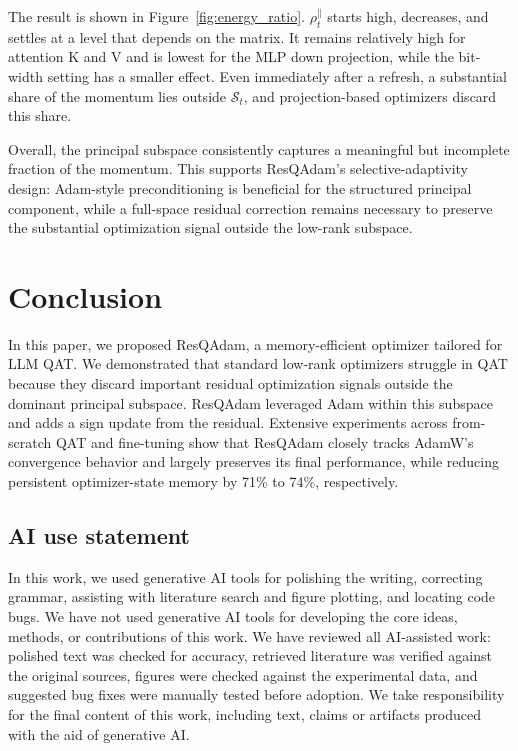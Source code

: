 \documentclass{article} %
\begin{document}
The result is shown in Figure~\ref{fig:energy_ratio}. $\rho_t^{\parallel}$ starts high, decreases, and settles at a level that depends on the matrix. 
It remains relatively high for attention K and V and is lowest for the MLP down projection, while the bit-width setting has a smaller effect. 
Even immediately after a refresh, a substantial share of the momentum lies outside $\mathcal{S}_t$, and projection-based optimizers discard this share.

Overall, the principal subspace consistently captures a meaningful but incomplete fraction of the momentum. This supports ResQAdam's selective-adaptivity design: Adam-style preconditioning is beneficial for the structured principal component, while a full-space residual correction remains necessary to preserve the substantial optimization signal outside the low-rank subspace.

\vspace{-0.07in}
\section{Conclusion}
\vspace{-0.05in}
In this paper, we proposed ResQAdam, a memory-efficient optimizer tailored for LLM QAT. We demonstrated that standard low-rank optimizers struggle in QAT because they discard important residual optimization signals outside the dominant principal subspace.
ResQAdam leveraged Adam within this subspace and adds a sign update from the residual.
Extensive experiments across from-scratch QAT and fine-tuning show that ResQAdam closely tracks AdamW's convergence behavior and largely preserves its final performance, while reducing persistent optimizer-state memory by 71\% to 74\%, respectively.

\subsection*{AI use statement}
In this work, we used generative AI tools for polishing the writing, correcting grammar, assisting with literature search and figure plotting, and locating code bugs. We have not used generative AI tools for developing the core ideas, methods, or contributions of this work. We have reviewed all AI-assisted work: polished text was checked for accuracy, retrieved literature was verified against the original sources, figures were checked against the experimental data, and suggested bug fixes were manually tested before adoption. We take responsibility for the final content of this work, including text, claims or artifacts produced with the aid of generative AI.
\end{document}
